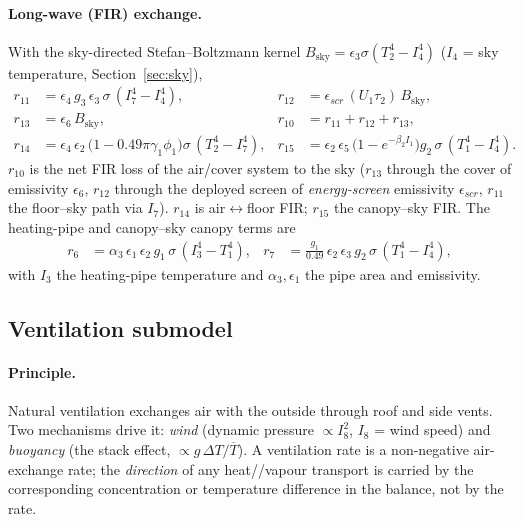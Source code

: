 \documentclass[11pt,a4paper]{article}
\newcommand{\Tcan}{T_{1}}
\newcommand{\Tair}{T_{2}}
\begin{document}
\paragraph{Long-wave (FIR) exchange.} With the sky-directed Stefan--Boltzmann kernel
$B_{\text{sky}}=\epsilon_3\sigma(\Tair^4-I_4^4)$ ($I_4$ = sky temperature, Section~\ref{sec:sky}),
\begin{align}
  r_{11} &= \epsilon_4\,g_3\,\epsilon_3\,\sigma\,(I_7^4 - I_4^4), &
  r_{12} &= \epsilon_{scr}\,(U_1\tau_2)\,B_{\text{sky}}, \\
  r_{13} &= \epsilon_6\,B_{\text{sky}}, &
  r_{10} &= r_{11}+r_{12}+r_{13},\\
  r_{14} &= \epsilon_4\,\epsilon_2\,\big(1-0.49\pi\gamma_1\phi_1\big)\sigma\,(\Tair^4 - I_7^4), &
  r_{15} &= \epsilon_2\,\epsilon_5\,\big(1-e^{-\beta_2 I_1}\big)g_2\,\sigma\,(\Tcan^4 - I_4^4).
\end{align}
$r_{10}$ is the net FIR loss of the air/cover system to the sky ($r_{13}$ through the cover of
emissivity $\epsilon_6$, $r_{12}$ through the deployed screen of \emph{energy-screen} emissivity
$\epsilon_{scr}$, $r_{11}$ the floor--sky path via $I_7$). $r_{14}$ is air$\leftrightarrow$floor FIR;
$r_{15}$ the canopy--sky FIR. The heating-pipe and canopy--sky canopy terms are
\begin{align}
  r_6 &= \alpha_3\,\epsilon_1\,\epsilon_2\,g_1\,\sigma\,(I_3^4 - \Tcan^4), &
  r_7 &= \frac{g_1}{0.49}\,\epsilon_2\,\epsilon_3\,g_2\,\sigma\,(\Tcan^4 - I_4^4),
\end{align}
with $I_3$ the heating-pipe temperature and $\alpha_3,\epsilon_1$ the pipe area and emissivity.

\subsection{Ventilation submodel}\label{sec:vent}
\paragraph{Principle.} Natural ventilation exchanges air with the outside through roof and side
vents. Two mechanisms drive it: \emph{wind} (dynamic pressure $\propto I_8^2$, $I_8$ = wind speed)
and \emph{buoyancy} (the stack effect, $\propto g\,\Delta T/\overline{T}$). A ventilation rate is a
non-negative air-exchange rate; the \emph{direction} of any heat//vapour transport is carried
by the corresponding concentration or temperature difference in the balance, not by the rate.
\end{document}
